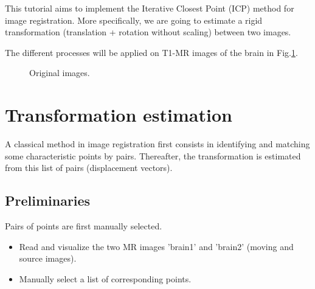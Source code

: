 \def\difficulty{3}

\begin{note}This tutorial aims to implement the Iterative Closest Point (ICP) method for image registration. More specifically, we are going to estimate a rigid transformation (translation + rotation without scaling) between two images.
\end{note}

The different processes will be applied on T1-MR images of the brain in Fig.\ref{fig:registration:enonce:original}.
\begin{figure}[h]
\centering\caption{Original images.}%
\hspace{1cm}
%
\label{fig:registration:enonce:original}%
\end{figure}

\section{Transformation estimation}

A classical method in image registration first consists in identifying and matching some characteristic points by pairs. Thereafter, the transformation is estimated from this list of pairs (displacement vectors).
\subsection{Preliminaries}
Pairs of points are first manually selected.
\begin{qbox}
\begin{itemize}
	\item Read and visualize the two MR images 'brain1' and 'brain2' (moving and source images).
	\item Manually select a list of corresponding points.
\end{itemize}
\end{qbox}

